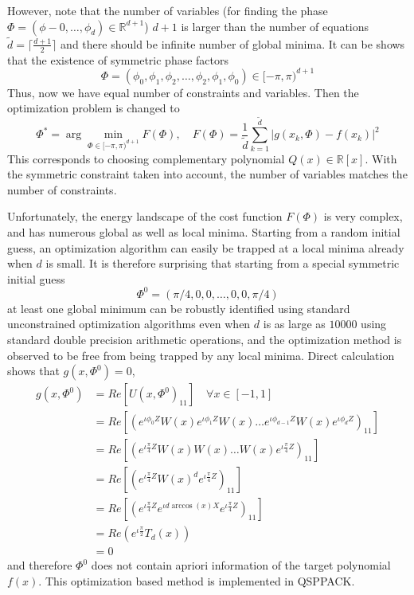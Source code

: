 \documentclass[12pt, oneside]{book}
\theoremstyle{definition}
\theoremstyle{definition}
\theoremstyle{remark}
\begin{document}
However, note that the number of variables (for finding the phase $\Phi = (\phi-0,\ldots,\phi_d)\in\mathbb{R}^{d+1}$) $d+1$ is larger than the number of equations $\tilde{d}=\lceil\frac{d+1}{2}\rceil$ and there should be infinite number of global minima. It can be shows that the existence of symmetric phase factors
\[
\Phi = (\phi_0,\phi_1,\phi_2,\ldots,\phi_2,\phi_1,\phi_0)\in[-\pi,\pi)^{d+1}
\]
Thus, now we have equal number of constraints and variables. Then the optimization problem is changed to
\[
\Phi^*=\arg \min_{\Phi\in[-\pi,\pi)^{d+1}} F(\Phi),\quad F(\Phi)=\frac{1}{\tilde{d}}\sum_{k=1}^{\tilde{d}}|g(x_k,\Phi)-f(x_k)|^2
\]
This corresponds to choosing complementary polynomial $Q(x)\in\mathbb{R}[x]$. With the symmetric constraint taken into account, the number of variables matches the number of constraints. 

Unfortunately, the energy landscape of the cost function $F(\Phi)$ is very complex, and has numerous global as well as local minima. Starting from a random initial guess, an optimization algorithm can easily be trapped at a local minima already when $d$ is small. It is therefore surprising that starting from a special symmetric initial guess
\[
\Phi^0 = (\pi/4,0,0,\ldots,0,0,\pi/4)
\]
at least one global minimum can be robustly identified using standard unconstrained optimization algorithms even when $d$ is as large as $10000$ using standard double precision arithmetic operations, and the optimization method is observed to be free from being trapped by any local minima. Direct calculation shows that $g(x,\Phi^0)=0$, 
\begin{align*}
g(x,\Phi^0)&=Re[U(x,\Phi^0)_{11}]\quad \forall x\in[-1,1]\\
&=Re[(e^{\iota \phi_0Z}W(x)e^{\iota \phi_1Z}W(x)\ldots e^{\iota \phi_{d-1}Z}W(x)e^{\iota \phi_dZ})_{11}]\\
&=Re[(e^{\iota \frac{\pi}{4}Z}W(x)W(x)\ldots W(x)e^{\iota\frac{\pi}{4}Z})_{11}]\\
&=Re[(e^{\iota \frac{\pi}{4}Z}W(x)^de^{\iota \frac{\pi}{4}Z})_{11}]\\
&=Re[(e^{\iota \frac{\pi}{4}Z}e^{\iota d\arccos(x)X}e^{\iota \frac{\pi}{4}Z})_{11}]\\
&=Re(e^{\iota \frac{\pi}{2}}T_d(x))\\
&=0
\end{align*}
and therefore $\Phi^0$ does not contain apriori information of the target polynomial $f(x)$. This optimization based method is implemented in QSPPACK.
\end{document}
